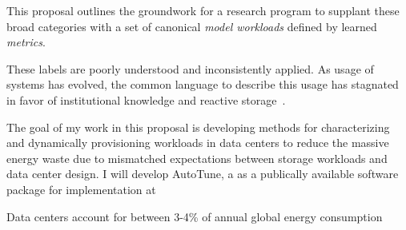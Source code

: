 This proposal outlines the groundwork for a research program to supplant these
broad categories with a set of canonical \textit{model workloads} defined by learned
\textit{metrics}.  


These labels are poorly
understood and inconsistently applied.  As usage of systems has evolved, the common
language to describe this usage has stagnated in favor of institutional knowledge and reactive storage~\cite{TK}.


The goal of my work in this proposal is developing methods for characterizing and dynamically provisioning workloads in data centers to reduce the massive energy waste due to mismatched 
expectations between storage workloads and data center design. I will develop AutoTune, a %
as a publically available software package for implementation at %

Data centers account for between 3-4\% of annual global energy                                          
consumption~\cite{nrdc} %

%         



